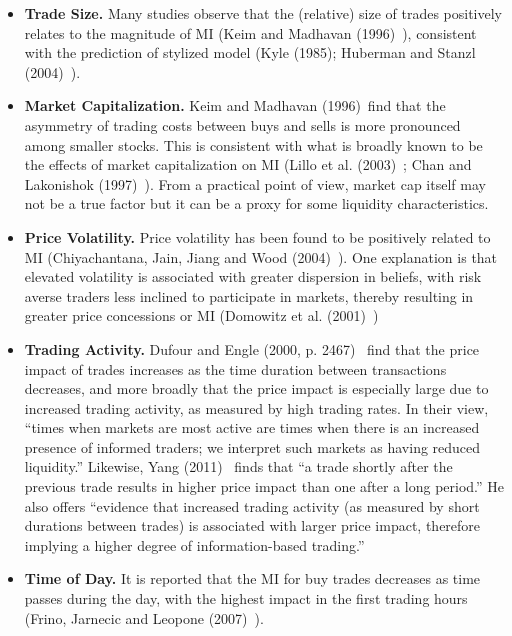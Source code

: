 \begin{itemize}
\item \textbf{Trade Size.} Many studies observe that the (relative) size of trades positively relates to the magnitude of MI (Keim and Madhavan (1996)~\cite{madhavan}), consistent with the prediction of stylized model (Kyle (1985)\cite{kyle1985}; Huberman and Stanzl (2004)~\cite{huberstan}).

\item \textbf{Market Capitalization.} Keim and Madhavan (1996)~\cite{keim1996}find that the asymmetry of trading costs between buys and sells is more pronounced among smaller stocks. This is consistent with what is broadly known to be the effects of market capitalization on MI (Lillo et al. (2003)~\cite{farmermantegna}; Chan and Lakonishok (1997)~\cite{chan1997}). From a practical point of view, market cap itself may not be a true factor but it can be a proxy for some liquidity characteristics. 

\item \textbf{Price Volatility.} Price volatility has been found to be positively related to MI (Chiyachantana, Jain, Jiang and Wood (2004)~\cite{chiya2004}). One explanation is that elevated volatility is associated with greater dispersion in beliefs, with risk averse traders less inclined to participate in markets, thereby resulting in greater price concessions or MI (Domowitz et al. (2001)~\cite{domo2001})

\item \textbf{Trading Activity.} Dufour and Engle (2000, p. 2467)~\cite{dufour} find that the price impact of trades increases as the time duration between transactions decreases, and more broadly that the price impact is especially large due to increased trading activity, as measured by high trading rates. In their view, ``times when markets are most active are times when there is an increased presence of informed traders; we interpret such markets as having reduced liquidity.'' Likewise, Yang (2011)~\cite[p.91]{yang2011} finds that ``a trade shortly after the previous trade results in higher price impact than one after a long period.'' He also offers ``evidence that increased trading activity (as measured by short durations between trades) is associated with larger price impact, therefore implying a higher degree of information-based trading.''

\item \textbf{Time of Day.} It is reported that the MI for buy trades decreases as time passes during the day, with the highest impact in the first trading hours (Frino, Jarnecic and Leopone (2007)~\cite{frino}).
\end{itemize}



